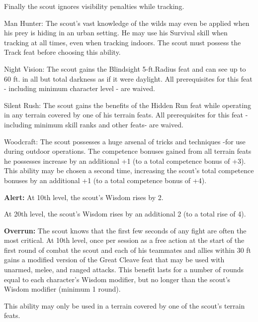 \begin{description*}
Finally the scout ignores visibility penalties while tracking.
\item[\hspace{1.5cm}Man Hunter:] The scout's vast knowledge of the wilds may even be applied when his prey is hiding in an urban setting. He may use his Survival skill when tracking at all times, even when tracking indoors. The scout must possess the Track feat before choosing this ability.
\item[\hspace{1.5cm}Night Vision:] The scout gains the Blindsight 5-ft.Radius feat and can see up to 60 ft. in all but total darkness as if it were daylight. All prerequisites for this feat - including minimum character level - are waived.
\item[\hspace{1.5cm}Silent Rush:] The scout gains the benefits of the Hidden Run feat while operating in any terrain covered by one of his terrain feats. All prerequisites for this feat - including minimum skill ranks and other feats- are waived.
\item[\hspace{1.5cm}Woodcraft:] The scout possesses a huge arsenal of tricks and techniques -for use during outdoor operations. The competence bonuses gained from all terrain feats he possesses increase by an additional +1 (to a total competence bonus of +3). This ability may be chosen a second time, increasing the scout's total competence bonuses by an additional +1 (to a total competence bonus of +4).
\end{description*}

\textbf{Alert:} At 10th level, the scout's Wisdom rises by 2.

At 20th level, the scout's Wisdom rises by an additional 2 (to a total rise of 4).

\textbf{Overrun:} The scout knows that the first few seconds of any fight are often the most critical. At 10th level, once per session as a free action at the start of the first round of combat the scout and each of his teammates and allies within 30 ft gains a modified version of the Great Cleave feat that may be used with unarmed, melee, and ranged attacks. This benefit lasts for a number of rounds equal to each character's Wisdom modifier, but no longer than the scout's Wisdom modifier (minimum 1 round).

This ability may only be used in a terrain covered by one of the scout's terrain feats.



